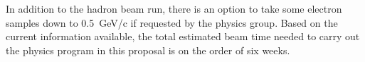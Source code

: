 
In addition to the hadron beam run, there is an option to take some electron samples down to 0.5~GeV/c if requested by the physics group. 
Based on the current information available, the total estimated beam time needed to carry out the physics program in this proposal is on the order of six weeks.
 
 



